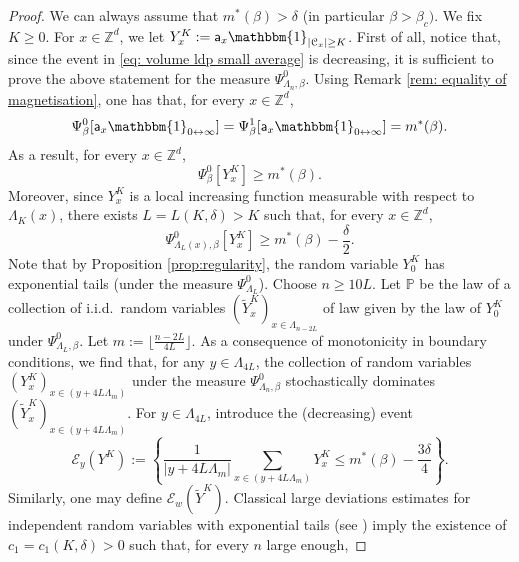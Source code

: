 \documentclass[11pt,a4paper]{article}
\theoremstyle{definition}
\numberwithin{equation}{section}
\begin{document}
\begin{proof} We can always assume that $m^*(\beta)>\delta$ (in particular $\beta>\beta_c)$. We fix $K\geq 0$. For $x\in \mathbb Z^d$, we let $Y_x^{K}:=\mathsf{a}_x\mathbbm{1}_{|\mathcal{C}_x|\geq K}$. First of all, notice that, since the event in \eqref{eq: volume ldp small average} is decreasing, it is sufficient to prove the above statement for the measure $\Psi_{\Lambda_n,\beta}^0$. Using Remark \ref{rem: equality of magnetisation}, one has that, for every $x\in \mathbb Z^d$,
\begin{equation}
    \Psi^{0}_{\beta}[\mathsf{a}_x\mathbbm{1}_{0\leftrightarrow \infty}]=\Psi^{1}_{\beta}[\mathsf{a}_x\mathbbm{1}_{0\leftrightarrow \infty}]=m^*(\beta).
\end{equation}
As a result, for every $x\in \mathbb Z^d$,
\begin{equation}
     \Psi^{0}_{\beta}[Y_x^{K}]\geq m^*(\beta).
\end{equation}
Moreover, since $Y_x^K$ is a local increasing function measurable with respect to $\Lambda_K(x)$, there exists $L=L(K,\delta)>K$ such that, for every $x\in \mathbb Z^d$,
\begin{equation}\label{eq:proof lower ldp1}
    \Psi^{0}_{\Lambda_L(x),\beta}[Y_x^K]\geq m^*(\beta)-\frac{\delta}{2}.
\end{equation}
Note that by Proposition \ref{prop:regularity}, the random variable $Y_0^K$ has exponential tails (under the measure $\Psi^0_{\Lambda_L}$).
Choose $n\geq 10L$. Let $\mathbb P$ be the law of a collection of i.i.d.\ random variables $(\tilde{Y}_x^K)_{x\in \Lambda_{n-2L}}$ of law given by the law of $Y_0^K$ under $\Psi^0_{\Lambda_L,\beta}$. Let $m:=\lfloor \tfrac{n-2L}{4L}\rfloor$.
As a consequence of monotonicity in boundary conditions, we find that, for any $y\in \Lambda_{4L}$, the collection of random variables $(Y_x^{K})_{x \in (y+4L\Lambda_m)}$ under the measure $\Psi^0_{\Lambda_n,\beta}$ stochastically dominates  $(\tilde{Y}_x^K)_{x \in (y+4L\Lambda_m)}$. For $y\in \Lambda_{4L}$, introduce the (decreasing) event
\begin{equation}
    \mathcal{E}_y(Y^K):=\left\{\frac{1}{ |y+4L\Lambda_m|}\sum_{x\in (y+4L\Lambda_m)}Y^K_x\leq m^*(\beta)-\frac{3\delta}{4}\right\}.
\end{equation}
Similarly, one may define $\mathcal{E}_w(\tilde{Y}^K).$ Classical large deviations estimates for independent random variables with exponential tails (see \cite[Theorem~2.7.7]{durrett2019probability}) imply the existence of $c_1=c_1(K,\delta)>0$ such that, for every $n$ large enough,

\end{proof}
\end{document}
